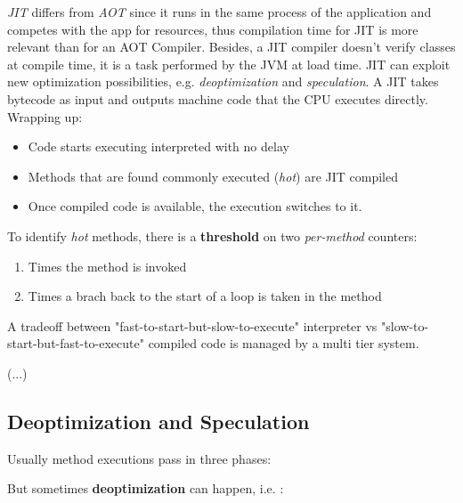\textit{JIT} differs from \textit{AOT} since it runs in the same process of the application and competes with the app for resources,
thus compilation time for JIT is more relevant than for an AOT Compiler.
Besides, a JIT compiler doesn't verify classes at compile time, it is a task performed by the JVM at load time. 
JIT can exploit new optimization possibilities, e.g. \textit{deoptimization} and \textit{speculation}.
A JIT takes bytecode as input and outputs machine code that the CPU executes directly.\\
Wrapping up:
\begin{itemize}
    \item Code starts executing interpreted with no delay
    \item Methods that are found commonly executed (\textit{hot}) are JIT compiled
    \item Once compiled code is available, the execution switches to it.
\end{itemize}

To identify \textit{hot} methods, there is a \textbf{threshold} on two \textit{per-method} counters:
\begin{enumerate}
    \item Times the method is invoked
    \item Times a brach back to the start of a loop is taken in the method
\end{enumerate}

A tradeoff between
"fast-to-start-but-slow-to-execute" interpreter vs "slow-to-
start-but-fast-to-execute" compiled code
is managed by a multi tier system.

(...)

\subsection{Deoptimization and Speculation}
Usually method executions pass in three phases:
\nl


But sometimes \textbf{deoptimization} can happen, i.e. :
\nl

